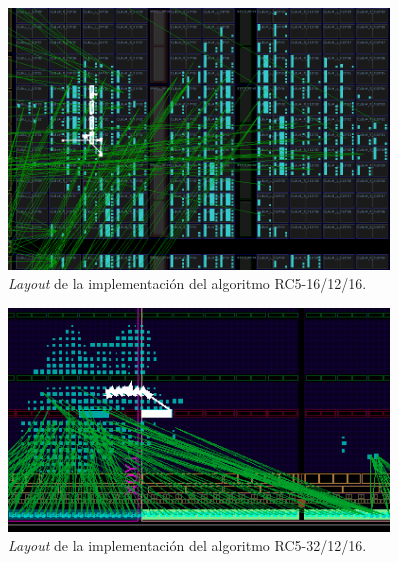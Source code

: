 \begin{figure}
	\includegraphics[width=0.9\textwidth]{./images/fig16_12_16_layout}
	\caption{\textit{Layout} de la implementación del algoritmo RC5-16/12/16.}
	\label{fig16_12_16_layout}
\end{figure}

\begin{figure}
	\includegraphics[width=0.9\textwidth]{./images/fig32_12_16_layout}
	\caption{\textit{Layout} de la implementación del algoritmo RC5-32/12/16.}
	\label{fig32_12_16_layout}
\end{figure}


